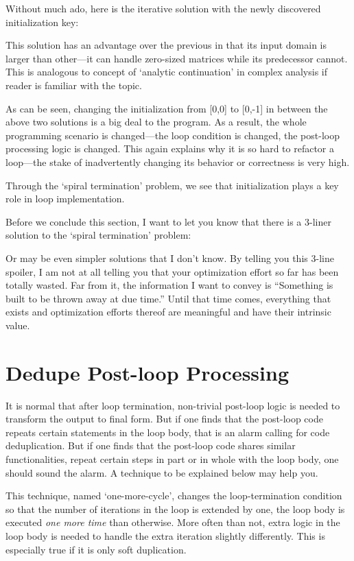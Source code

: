 Without much ado, here is the iterative solution with the newly discovered initialization key:

This solution has an advantage over the previous in that
its input domain is larger than other---it can handle zero-sized matrices while its predecessor
cannot.
This is analogous to concept of `analytic continuation' in complex analysis if
reader is familiar with the topic.


As can be seen, changing the initialization from [0,0] to [0,-1] in between the above two solutions
is a big deal to the program.
As a result, the whole programming scenario is changed---the loop condition is changed,
the post-loop processing logic is changed.
This again explains why it is so hard to refactor a loop---the stake of inadvertently changing
its behavior or correctness is very high.


Through the `spiral termination' problem, we see that initialization plays a key role in loop
implementation.


Before we conclude this section, I want to let you know that there is a 3-liner solution to the
`spiral termination' problem:

Or may be even simpler solutions that I don't know.
By telling you this 3-line spoiler, I am not at all telling you that your
optimization effort so far has been totally wasted.
Far from it, the information I want to convey is ``Something is built to be thrown away
at due time.''
Until that time comes, everything that exists and optimization efforts thereof are
meaningful and have their intrinsic value.


\section{Dedupe Post-loop Processing}\label{sec:one-more-cycle}

It is normal that after loop termination, non-trivial post-loop logic is needed to
transform the output to final form.
But if one finds that the post-loop code repeats certain statements in the loop body,
that is an alarm calling for code deduplication.
But if one finds that the post-loop code shares similar functionalities,
repeat certain steps in part or in whole with the loop body, one should sound the alarm.
A technique to be explained below may help you.


This technique, named `one-more-cycle', changes the loop-termination condition so that
the number of iterations in the loop is extended by one, the loop body is executed \emph{one more time}
than otherwise.
More often than not, extra logic in the loop body is needed to handle the extra iteration
slightly differently.
This is especially true if it is only soft duplication.


